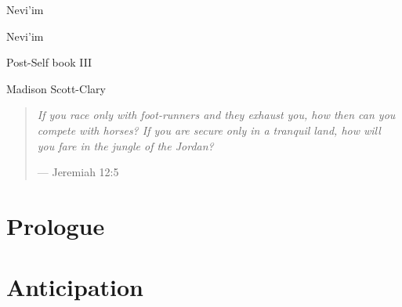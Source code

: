 \documentclass[11pt]{memoir}
\begin{document}
  \frontmatter

  \thispagestyle{empty}
  \null
  \vfill
  \begin{flushright}
    \DisplayFont Nevi'im
  \end{flushright}
  \vfill
  \cleardoublepage

  \pagestyle{plain}

  \doublespacing

  \begin{flushright}
    \null
    \vfill
    {\Huge\DisplayFont Nevi'im}

    {\DisplayFont Post-Self book III}

    \vfill

    {\Large\DisplayFont Madison Scott-Clary}
  \end{flushright}
  \thispagestyle{empty}

  \newpage

  

  \newpage
  \null
  \cleardoublepage



  \mainmatter

  \pagestyle{ourbook}

  \cleardoublepage
  \null
  \thispagestyle{empty}
  \vfill
  \begin{quote}
    \small
    \emph{If you race only with foot-runners and they exhaust you, how then can you compete with horses? If you are secure only in a tranquil land, how will you fare in the jungle of the Jordan?}

    --- Jeremiah 12:5
  \end{quote}
  \vfill

  \part*{Prologue}
  

  \part{Anticipation}
  
  
  
  
  
  
  
  
  
  
  
  
  
  
\end{document}
